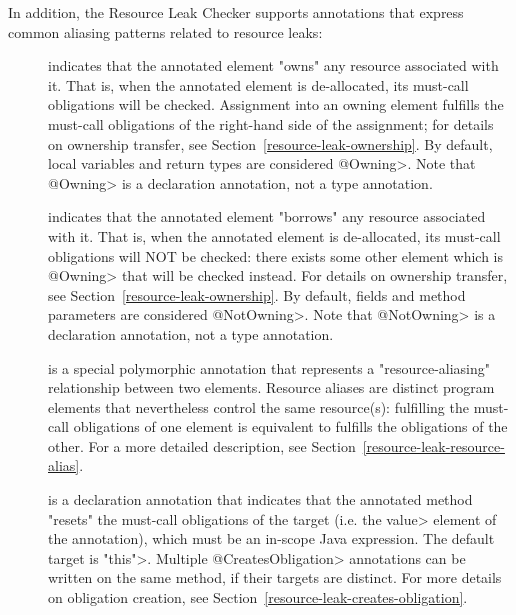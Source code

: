 In addition, the Resource Leak Checker supports annotations that express common
aliasing patterns related to resource leaks:

\begin{description}

\item[]
  indicates that the annotated element "owns" any resource associated with
  it. That is, when the annotated element is de-allocated, its must-call
  obligations will be checked. Assignment into an owning element fulfills
  the must-call obligations of the right-hand side of the assignment; for
  details on ownership transfer, see Section~\ref{resource-leak-ownership}.
  By default, local variables and return types are considered \<@Owning>.
  Note that \<@Owning> is a declaration annotation, not a type annotation.

\item[]
  indicates that the annotated element "borrows" any resource associated with
  it. That is, when the annotated element is de-allocated, its must-call
  obligations will NOT be checked: there exists some other element which is
  \<@Owning> that will be checked instead. For
  details on ownership transfer, see Section~\ref{resource-leak-ownership}.
  By default, fields and method parameters are considered \<@NotOwning>.
  Note that \<@NotOwning> is a declaration annotation, not a type annotation.

\item[]
  is a special polymorphic annotation that represents a "resource-aliasing"
  relationship between two elements. Resource aliases are distinct program elements
  that nevertheless control the same resource(s): fulfilling the must-call obligations
  of one element is equivalent to fulfills the obligations of the other.
  For a more detailed description, see
  Section~\ref{resource-leak-resource-alias}.

\item[]
  is a declaration annotation that indicates that the annotated method "resets" the must-call
  obligations of the target (i.e. the \<value> element of the annotation), which must
  be an in-scope Java expression. The default target is \<"this">. Multiple \<@CreatesObligation>
  annotations can be written on the same method, if their targets are distinct. For more details
  on obligation creation, see Section~\ref{resource-leak-creates-obligation}.

\end{description}

